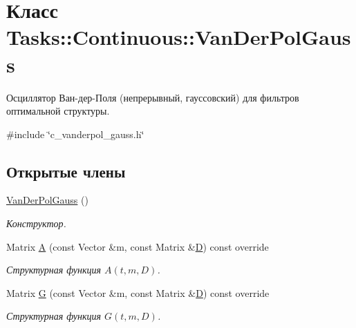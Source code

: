 \hypertarget{class_tasks_1_1_continuous_1_1_van_der_pol_gauss}{}\section{Класс Tasks\+:\+:Continuous\+:\+:Van\+Der\+Pol\+Gauss}
\label{class_tasks_1_1_continuous_1_1_van_der_pol_gauss}


Осциллятор Ван-\/дер-\/Поля (непрерывный, гауссовский) для фильтров оптимальной структуры.  




{\ttfamily \#include \char`\"{}c\+\_\+vanderpol\+\_\+gauss.\+h\char`\"{}}

\subsection*{Открытые члены}
\begin{DoxyCompactItemize}
\item 
\hyperlink{class_tasks_1_1_continuous_1_1_van_der_pol_gauss_ae40ae7f81419b9ca24403335e72d92d2}{Van\+Der\+Pol\+Gauss} ()\hypertarget{class_tasks_1_1_continuous_1_1_van_der_pol_gauss_ae40ae7f81419b9ca24403335e72d92d2}{}\label{class_tasks_1_1_continuous_1_1_van_der_pol_gauss_ae40ae7f81419b9ca24403335e72d92d2}

\begin{DoxyCompactList}\small\item\em Конструктор. \end{DoxyCompactList}\item 
Matrix \hyperlink{class_tasks_1_1_continuous_1_1_van_der_pol_gauss_a2ef625f7f8c590726c5b52e67622c172}{A} (const Vector \&m, const Matrix \&\hyperlink{class_tasks_1_1_continuous_1_1_van_der_pol_linear_a07e8842a175006f214238a9f71e5ebdf}{D}) const override
\begin{DoxyCompactList}\small\item\em Структурная функция $A(t, m, D)$. \end{DoxyCompactList}\item 
Matrix \hyperlink{class_tasks_1_1_continuous_1_1_van_der_pol_gauss_a1b61ca6de96df17b049bc7934a241e47}{G} (const Vector \&m, const Matrix \&\hyperlink{class_tasks_1_1_continuous_1_1_van_der_pol_linear_a07e8842a175006f214238a9f71e5ebdf}{D}) const override
\begin{DoxyCompactList}\small\item\em Структурная функция $G(t, m, D)$. \end{DoxyCompactList}\end{DoxyCompactItemize}
